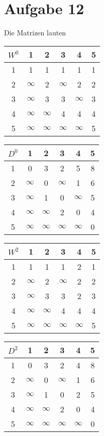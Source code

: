 \documentclass{article}
\begin{document}
	\section*{Aufgabe 12}
	Die Matrizen lauten
	\begin{center}
		\begin{tabular}{c|ccccc}
			$W^0$ & 1 & 2 & 3 & 4 & 5 \\
			\hline
			1 & 1 & 1 & 1 & 1 & 1 \\
			2 & $\infty$ & 2 & $\infty$ & 2 & 2 \\
			3 & $\infty$ & 3 & 3 & $\infty$ & 3 \\
			4 & $\infty$ & $\infty$ & 4 & 4 & 4 \\
			5 & $\infty$ & $\infty$ & $\infty$ & $\infty$ & 5
		\end{tabular}
		\begin{tabular}{c|ccccc}
			$D^0$ & 1 & 2 & 3 & 4 & 5 \\
			\hline
			1 & 0 & 3 & 2 & 5 & 8 \\
			2 & $\infty$ & 0 & $\infty$ & 1 & 6 \\
			3 & $\infty$ & 1 & 0 & $\infty$ & 5 \\
			4 & $\infty$ & $\infty$ & 2 & 0 & 4 \\
			5 & $\infty$ & $\infty$ & $\infty$ & $\infty$ & 0
		\end{tabular}
	\end{center}
	\begin{center}
		\begin{tabular}{c|ccccc}
			$W^2$ & 1 & 2 & 3 & 4 & 5 \\
			\hline
			1 & 1 & \cellcolor{blue!20}1 & 1 & 2 & 1 \\
			2 & \cellcolor{blue!20}$\infty$ & \cellcolor{blue!20}2 & \cellcolor{blue!20}$\infty$ & \cellcolor{blue!20}2 & \cellcolor{blue!20}2 \\
			3 & $\infty$ & \cellcolor{blue!20}3 & 3 & 2 & 3 \\
			4 & $\infty$ & \cellcolor{blue!20}$\infty$ & 4 & 4 & 4 \\
			5 & $\infty$ & \cellcolor{blue!20}$\infty$ & $\infty$ & $\infty$ & 5
		\end{tabular}
		\begin{tabular}{c|ccccc}
			$D^2$ & 1 & 2 & 3 & 4 & 5 \\
			\hline
			1 & 0 & \cellcolor{blue!20}3 & 2 & 4 & 8 \\
			2 & \cellcolor{blue!20}$\infty$ & \cellcolor{blue!20}0 & \cellcolor{blue!20}$\infty$ & \cellcolor{blue!20}1 & \cellcolor{blue!20}6 \\
			3 & $\infty$ & \cellcolor{blue!20}1 & 0 & 2 & 5 \\
			4 & $\infty$ & \cellcolor{blue!20}$\infty$ & 2 & 0 & 4 \\
			5 & $\infty$ & \cellcolor{blue!20}$\infty$ & $\infty$ & $\infty$ & 0
		\end{tabular}
	\end{center}
\end{document}
